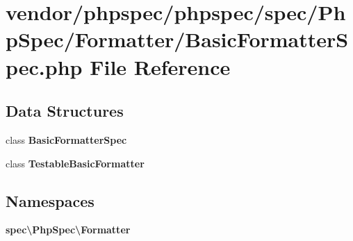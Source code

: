 \section{vendor/phpspec/phpspec/spec/\+Php\+Spec/\+Formatter/\+Basic\+Formatter\+Spec.php File Reference}
\label{_basic_formatter_spec_8php}
\subsection*{Data Structures}
\begin{DoxyCompactItemize}
\item 
class {\bf Basic\+Formatter\+Spec}
\item 
class {\bf Testable\+Basic\+Formatter}
\end{DoxyCompactItemize}
\subsection*{Namespaces}
\begin{DoxyCompactItemize}
\item 
 {\bf spec\textbackslash{}\+Php\+Spec\textbackslash{}\+Formatter}
\end{DoxyCompactItemize}
